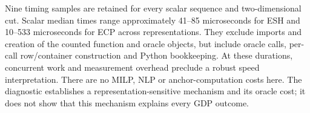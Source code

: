 Nine timing samples are retained for every scalar sequence and two-dimensional cut. Scalar median times range approximately 41--85 microseconds for ESH and 10--533 microseconds for ECP across representations. They exclude imports and creation of the counted function and oracle objects, but include oracle calls, per-call row/container construction and Python bookkeeping. At these durations, concurrent work and measurement overhead preclude a robust speed interpretation. There are no MILP, NLP or anchor-computation costs here. The diagnostic establishes a representation-sensitive mechanism and its oracle cost; it does not show that this mechanism explains every GDP outcome.
